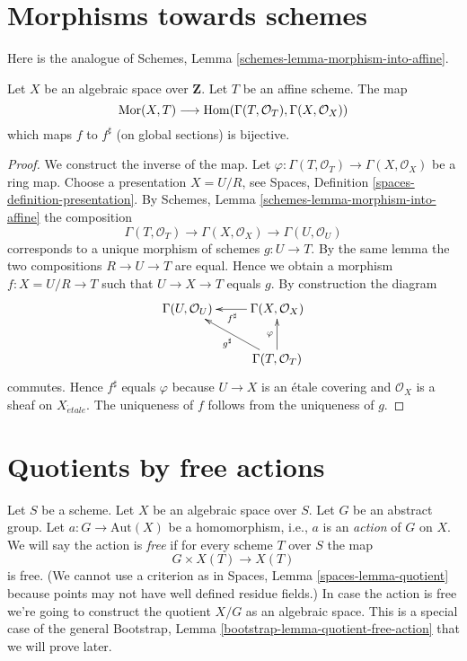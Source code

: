 \section{Morphisms towards schemes}
\label{section-morphisms-to-schemes}

\noindent
Here is the analogue of
Schemes, Lemma \ref{schemes-lemma-morphism-into-affine}.

\begin{lemma}
\label{lemma-morphism-to-affine-scheme}
Let $X$ be an algebraic space over $\mathbf{Z}$.
Let $T$ be an affine scheme.
The map
$$
\mathop{\rm Mor}\nolimits(X, T)
\longrightarrow
\mathop{\rm Hom}\nolimits(\Gamma(T, \mathcal{O}_T), \Gamma(X, \mathcal{O}_X))
$$
which maps $f$ to $f^\sharp$ (on global sections) is bijective.
\end{lemma}

\begin{proof}
We construct the inverse of the map.
Let $\varphi : \Gamma(T, \mathcal{O}_T) \to \Gamma(X, \mathcal{O}_X)$
be a ring map. Choose a presentation $X = U/R$, see
Spaces, Definition \ref{spaces-definition-presentation}.
By
Schemes, Lemma \ref{schemes-lemma-morphism-into-affine}
the composition
$$
\Gamma(T, \mathcal{O}_T) \to \Gamma(X, \mathcal{O}_X) \to
\Gamma(U, \mathcal{O}_U)
$$
corresponds to a unique morphism of schemes $g : U \to T$. By the same lemma
the two compositions $R \to U \to T$ are equal. Hence we obtain a morphism
$f : X = U/R \to T$ such that $U \to X \to T$ equals $g$. By construction
the diagram
$$
\xymatrix{
\Gamma(U, \mathcal{O}_U) & \Gamma(X, \mathcal{O}_X) \ar[l]^{f^\sharp} \\
& \Gamma(T, \mathcal{O}_T) \ar[lu]^{g^\sharp} \ar[u]^\varphi
}
$$
commutes. Hence $f^\sharp$ equals $\varphi$ because $U \to X$ is an
\'etale covering and $\mathcal{O}_X$ is a sheaf on $X_{\acute{e}tale}$.
The uniqueness of $f$ follows from the uniqueness of $g$.
\end{proof}





\section{Quotients by free actions}
\label{section-quotient-by-free}

\noindent
Let $S$ be a scheme.
Let $X$ be an algebraic space over $S$.
Let $G$ be an abstract group.
Let $a : G \to \text{Aut}(X)$ be a homomorphism, i.e., $a$ is an
{\it action} of $G$ on $X$. We will say the action is {\it free}
if for every scheme $T$ over $S$ the map
$$
G \times X(T) \longrightarrow X(T)
$$
is free. (We cannot use a criterion as in
Spaces, Lemma \ref{spaces-lemma-quotient}
because points may not have well defined residue fields.)
In case the action is free we're going to construct the quotient $X/G$
as an algebraic space. This is a special case of the general
Bootstrap, Lemma \ref{bootstrap-lemma-quotient-free-action}
that we will prove later.

